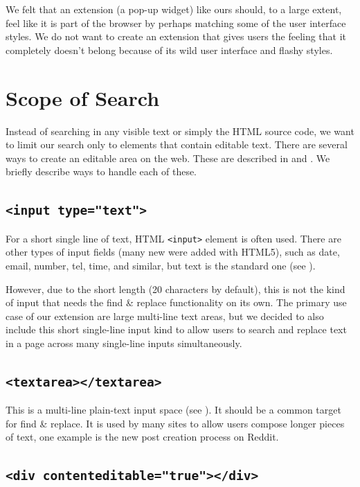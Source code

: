\documentclass[bsc,frontabs,twoside,singlespacing,parskip,deptreport]{infthesis}
\begin{document}
We felt that an extension (a pop-up widget) like ours should, to a large extent, feel like it is part of the browser by perhaps matching some of the user interface styles. We do not want to create an extension that gives users the feeling that it completely doesn't belong because of its wild user interface and flashy styles.

\section{Scope of Search}
Instead of searching in any visible text or simply the HTML source code, we want to limit our search only to elements that contain editable text. There are several ways to create an editable area on the web. These are described in \cite{M1} and \cite{P1}. We briefly describe ways to handle each of these.

\subsection{\texttt{\textless{}input\ type="text"\textgreater{}}}

For a short single line of text, HTML
\texttt{\textless{}input\textgreater{}} element is often used. There are
other types of input fields (many new were added with HTML5), such as
date, email, number, tel, time, and similar, but text is the standard
one (see \cite{M2}).

However, due to the short length (20 characters by default), this is not the kind of input that needs the find \& replace functionality on its own. The primary use case of our extension are large multi-line text areas, but we decided to also include this short single-line input kind to allow users to search and replace text in a page across many single-line inputs simultaneously.

\subsection{\texttt{\textless{}textarea\textgreater{}\textless{}/textarea\textgreater{}}}

This is a multi-line plain-text input space (see \cite{M3}). It should be a common target for find \& replace. It is used by many sites to allow users compose longer pieces of text, one example is the new post creation process on Reddit.

\subsection{\texttt{\textless{}div\ contenteditable="true"\textgreater{}\textless{}/div\textgreater{}}}
\end{document}
